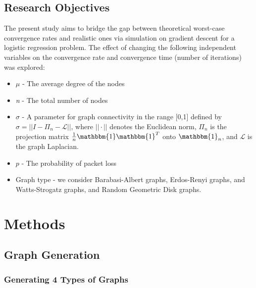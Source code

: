 \documentclass[conference]{IEEEtran}
\begin{document}
\subsection{Research Objectives}
The present study aims to bridge the gap between theoretical worst-case convergence rates and
realistic ones via simulation on gradient descent for a logistic regression problem. The effect of changing the following
independent variables on the convergence rate and convergence time (number of iterations) was explored:

\begin{itemize}
    \item $\mu$ - The average degree of the nodes
    \item \textit{n} - The total number of nodes
    \item $\sigma$ - A parameter for graph connectivity in the range [0,1] defined by $\sigma = ||I-\Pi_{n}-\mathcal{L}||$, where $||\cdot||$ denotes the Euclidean norm, $\Pi_{n}$ is the projection matrix $\frac{1}{n}\mathbbm{1}\mathbbm{1}^{T} $ onto $\mathbbm{1}_n$, and $\mathcal{L}$ is the graph Laplacian.
    \item $p$ - The probability of packet loss
    \item Graph type - we consider Barabasi-Albert graphs, Erdos-Renyi graphs, and Watts-Strogatz graphs, and Random Geometric Disk graphs.
\end{itemize} 

\section{Methods}
\label{sec:methods}
\subsection{Graph Generation}

\subsubsection{Generating 4 Types of Graphs}
\end{document}
